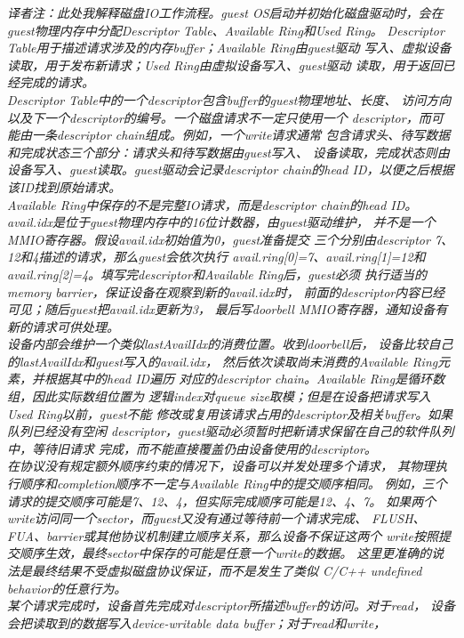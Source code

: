 \emph{译者注：此处我解释磁盘IO工作流程。guest OS启动并初始化磁盘驱动时，会在%
guest物理内存中分配Descriptor Table、Available Ring和Used Ring。%
Descriptor Table用于描述请求涉及的内存buffer；Available Ring由guest驱动%
写入、虚拟设备读取，用于发布新请求；Used Ring由虚拟设备写入、guest驱动%
读取，用于返回已经完成的请求。%
\\Descriptor Table中的一个descriptor包含buffer的guest物理地址、长度、%
访问方向以及下一个descriptor的编号。一个磁盘请求不一定只使用一个%
descriptor，而可能由一条descriptor chain组成。例如，一个write请求通常%
包含请求头、待写数据和完成状态三个部分：请求头和待写数据由guest写入、%
设备读取，完成状态则由设备写入、guest读取。guest驱动会记录descriptor %
chain的head ID，以便之后根据该ID找到原始请求。%
\\Available Ring中保存的不是完整IO请求，而是descriptor chain的head ID。%
avail.idx是位于guest物理内存中的16位计数器，由guest驱动维护，%
并不是一个MMIO寄存器。假设avail.idx初始值为0，guest准备提交%
三个分别由descriptor 7、12和4描述的请求，那么guest会依次执行%
avail.ring[0]=7、avail.ring[1]=12和%
avail.ring[2]=4。填写完descriptor和Available Ring后，guest必须%
执行适当的memory barrier，保证设备在观察到新的avail.idx时，%
前面的descriptor内容已经可见；随后guest把avail.idx更新为3，%
最后写doorbell MMIO寄存器，通知设备有新的请求可供处理。%
\\设备内部会维护一个类似lastAvailIdx的消费位置。收到doorbell后，%
设备比较自己的lastAvailIdx和guest写入的avail.idx，%
然后依次读取尚未消费的Available Ring元素，并根据其中的head ID遍历%
对应的descriptor chain。Available Ring是循环数组，因此实际数组位置为%
逻辑index对queue size取模；但是在设备把请求写入Used Ring以前，guest不能%
修改或复用该请求占用的descriptor及相关buffer。如果队列已经没有空闲%
descriptor，guest驱动必须暂时把新请求保留在自己的软件队列中，等待旧请求%
完成，而不能直接覆盖仍由设备使用的descriptor。%
\\在协议没有规定额外顺序约束的情况下，设备可以并发处理多个请求，%
其物理执行顺序和completion顺序不一定与Available Ring中的提交顺序相同。%
例如，三个请求的提交顺序可能是7、12、4，但实际完成顺序可能是12、4、7。%
如果两个write访问同一个sector，而guest又没有通过等待前一个请求完成、%
FLUSH、FUA、barrier或其他协议机制建立顺序关系，那么设备不保证这两个%
write按照提交顺序生效，最终sector中保存的可能是任意一个write的数据。%
这里更准确的说法是最终结果不受虚拟磁盘协议保证，而不是发生了类似%
C/C++ undefined behavior的任意行为。%
\\某个请求完成时，设备首先完成对descriptor所描述buffer的访问。对于read，%
设备会把读取到的数据写入device-writable data buffer；对于read和write，%
}
